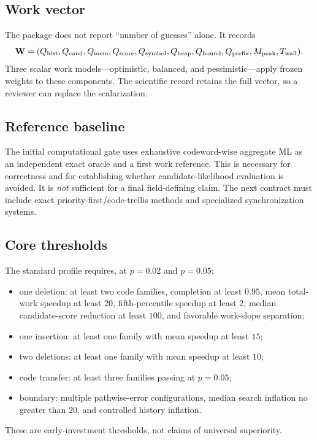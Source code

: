\documentclass[11pt]{article}
\begin{document}
\subsection{Work vector}
The package does not report ``number of guesses'' alone. It records
\begin{equation}
\mathbf W=(Q_{\rm hist},Q_{\rm cand},Q_{\rm mem},Q_{\rm score},Q_{\rm symbol},Q_{\rm heap},Q_{\rm bound},Q_{\rm prefix},M_{\rm peak},T_{\rm wall}).
\end{equation}
Three scalar work models---optimistic, balanced, and pessimistic---apply frozen weights to these components. The scientific record retains the full vector, so a reviewer can replace the scalarization.

\subsection{Reference baseline}
The initial computational gate uses exhaustive codeword-wise aggregate ML as an independent exact oracle and a first work reference. This is necessary for correctness and for establishing whether candidate-likelihood evaluation is avoided. It is \emph{not} sufficient for a final field-defining claim. The next contract must include exact priority-first/code-trellis methods and specialized synchronization systems.

\subsection{Core thresholds}
The standard profile requires, at $p=0.02$ and $p=0.05$:
\begin{itemize}
\item one deletion: at least two code families, completion at least $0.95$, mean total-work speedup at least $20$, fifth-percentile speedup at least $2$, median candidate-score reduction at least $100$, and favorable work-slope separation;
\item one insertion: at least one family with mean speedup at least $15$;
\item two deletions: at least one family with mean speedup at least $10$;
\item code transfer: at least three families passing at $p=0.05$;
\item boundary: multiple pathwise-error configurations, median search inflation no greater than $20$, and controlled history inflation.
\end{itemize}
These are early-investment thresholds, not claims of universal superiority.
\end{document}
